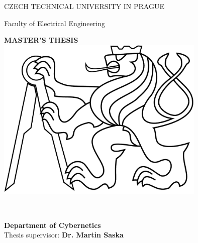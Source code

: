 \pagestyle{plain}

\begin{titlepage}
\begin{center}

{\Large CZECH TECHNICAL UNIVERSITY IN PRAGUE}
\vskip 10pt

\vskip 8pt
{\Large Faculty of Electrical Engineering}
 
\vspace{50pt}
{\Huge\bf MASTER'S THESIS}\\
\vspace{40pt}
\includegraphics[width=10cm]{fig/lev.pdf}

\vspace{40pt}
{\Large\rm \Author } \\
\vspace{20pt}
{\Large\bf \Title}

\vspace{60pt}
{\bf Department of Cybernetics}\\
\vspace{5pt}   
{Thesis supervisor: {\bf Dr. Martin Saska}}

\vspace{30pt}
\end{center}
\end{titlepage}

\pagestyle{empty}